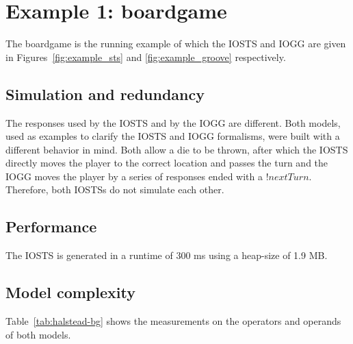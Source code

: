 \section{Example 1: boardgame}
The boardgame is the running example of which the IOSTS and IOGG are given in Figures~\ref{fig:example_sts} and \ref{fig:example_groove} respectively.

\subsection{Simulation and redundancy}
The responses used by the IOSTS and by the IOGG are different. Both models, used as examples to clarify the IOSTS and IOGG formalisms, were built with a different behavior in mind. Both allow a die to be thrown, after which the IOSTS directly moves the player to the correct location and passes the turn and the IOGG moves the player by a series of responses ended with a $!nextTurn$. Therefore, both IOSTSs do not simulate each other.

\subsection{Performance}
The IOSTS is generated in a runtime of 300 ms using a heap-size of 1.9 MB.

\subsection{Model complexity}
\begin{comment}
start:
13 distinct operands
1 distinct operator
33 operands
3 operators

move:
2 new distinct operands
5 new distinct operators
27 operands
6 operators

nextTurn:
0 new distinct operands
1 new distinct operator
13 operands
5 operators

throws:
3 new distinct operands
2 new distinct operators
30 operands
10 operators

$n_1 = 9, n_2 = 18, N_1 = 24, N_2 = 103$ 
 Volume is 127*4.75 = 603.25

IOSTS:
22 distinct operands
5 distinct operators
62 operands
25 operators

$n_1 = 5, n_2 = 22, N_1 = 25, N_2 = 62$
 Volume is 87*4.75 = 413.25
\end{comment}

Table~\ref{tab:halstead-bg} shows the measurements on the operators and operands of both models.

